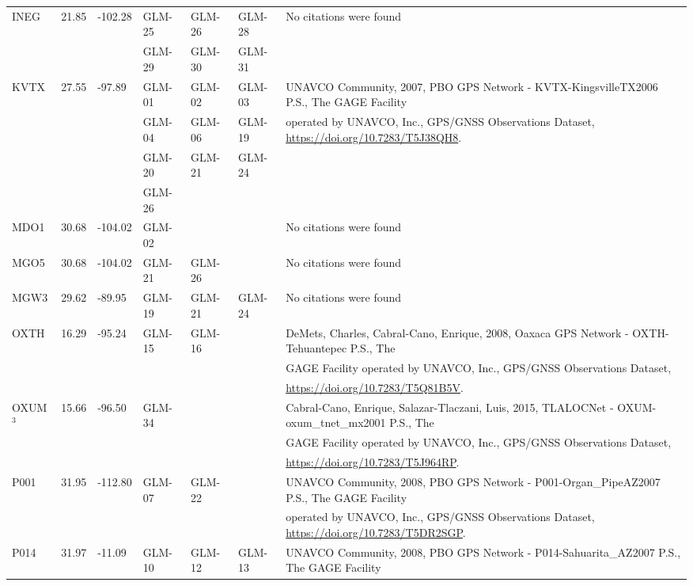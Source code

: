 \begin{landscape}
\begin{longtable}{llllllp{12cm}}
    \multirow{2}{*}{INEG} & \multirow{2}{*}{21.85} & \multirow{2}{*}{-102.28} & GLM-25 & GLM-26 & GLM-28  & No citations were found \\
    &&& GLM-29 & GLM-30 & GLM-31 & \\\hline 
    \multirow{4}{*}{KVTX} & \multirow{4}{*}{27.55} & \multirow{4}{*}{-97.89} & GLM-01 & GLM-02 & GLM-03  & UNAVCO Community, 2007, PBO GPS Network - KVTX-KingsvilleTX2006 P.S., The GAGE Facility \\
    &&& GLM-04 & GLM-06 & GLM-19 & operated by UNAVCO, Inc., GPS/GNSS Observations Dataset, \url{https://doi.org/10.7283/T5J38QH8}.\\
    &&& GLM-20 & GLM-21 & GLM-24 & \\
    &&& GLM-26 &&& \\\hline
    MDO1 & 30.68 & -104.02 & GLM-02 & & & No citations were found\\\hline
    MGO5 & 30.68 & -104.02 & GLM-21 &GLM-26 &  & No citations were found\\\hline
    MGW3 & 29.62 & -89.95 & GLM-19 & GLM-21 & GLM-24 & No citations were found\\\hline
    \multirow{3}{*}{OXTH} & \multirow{3}{*}{16.29} & \multirow{3}{*}{-95.24} & \multirow{3}{*}{GLM-15} & \multirow{3}{*}{GLM-16} & & DeMets, Charles, Cabral-Cano, Enrique, 2008, Oaxaca GPS Network - OXTH-Tehuantepec P.S., The \\
    &&&&&& GAGE Facility operated by UNAVCO, Inc., GPS/GNSS Observations Dataset, \\
    &&&&&& \url{https://doi.org/10.7283/T5Q81B5V}.\\\hline
    \multirow{3}{*}{OXUM\hyperlink{Graham}{${}^3$}} & \multirow{3}{*}{15.66} & \multirow{3}{*}{-96.50} & \multirow{3}{*}{GLM-34} & & & Cabral-Cano, Enrique, Salazar-Tlaczani, Luis, 2015, TLALOCNet - OXUM-oxum\_tnet\_mx2001 P.S., The \\
    &&&&&& GAGE Facility operated by UNAVCO, Inc., GPS/GNSS Observations Dataset, \\
    &&&&&& \url{https://doi.org/10.7283/T5J964RP}.\\\hline
    \multirow{2}{*}{P001} & \multirow{2}{*}{31.95} & \multirow{2}{*}{-112.80} & \multirow{2}{*}{GLM-07} & \multirow{2}{*}{GLM-22} & & UNAVCO Community, 2008, PBO GPS Network - P001-Organ\_PipeAZ2007 P.S., The GAGE Facility \\
    &&&&&& operated by UNAVCO, Inc., GPS/GNSS Observations Dataset, \url{https://doi.org/10.7283/T5DR2SGP}.\\\hline
    \multirow{2}{*}{P014} & \multirow{2}{*}{31.97} & \multirow{2}{*}{-11.09} & GLM-10 & GLM-12 & GLM-13 & UNAVCO Community, 2008, PBO GPS Network - P014-Sahuarita\_AZ2007 P.S., The GAGE Facility \\

\end{longtable}
\end{landscape}
